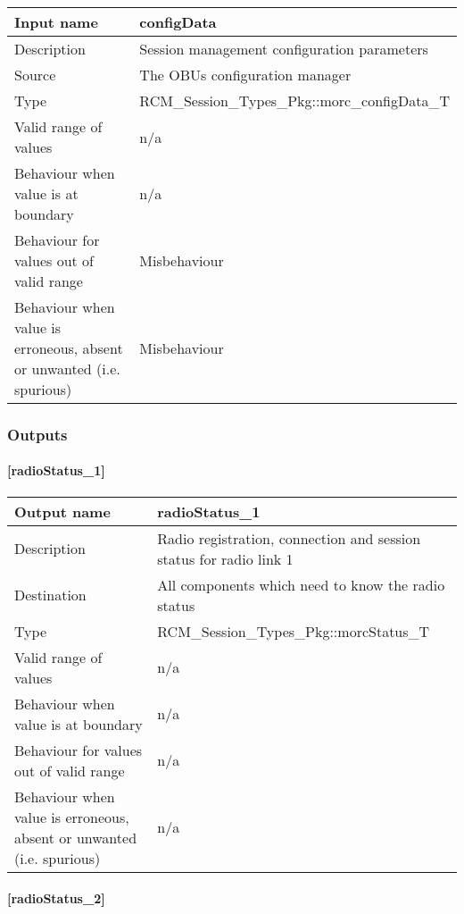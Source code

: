 \begin{longtable}{p{}p{}}
	\toprule
	Input name				& configData \\
	\midrule
	Description				& Session management configuration parameters \\
	\midrule
	Source					& The OBUs configuration manager \\ 
	\midrule
	Type					& RCM\_Session\_Types\_Pkg::morc\_configData\_T \\
	\midrule
	Valid range of values	& n/a \\
	\midrule
	Behaviour when value is at boundary	& n/a \\
	\midrule
	Behaviour for values out of valid range	& Misbehaviour \\
	\midrule
	Behaviour when value is erroneous, absent or unwanted (i.e. spurious) & Misbehaviour \\
	\bottomrule
\end{longtable}


\subsubsection{Outputs}\label{s:manage_radio_communication_outputs}

\paragraph{[radioStatus\_1]}

\begin{longtable}{p{}p{}}
\toprule
Output name				& radioStatus\_1 \\
\midrule
Description				& Radio registration, connection and session status for radio link 1 \\
\midrule
Destination				& All components which need to know the radio status \\ 
\midrule
Type					& RCM\_Session\_Types\_Pkg::morcStatus\_T \\
\midrule
Valid range of values	& n/a \\
\midrule
Behaviour when value is at boundary	& n/a \\
\midrule
Behaviour for values out of valid range	& n/a \\
\midrule
Behaviour when value is erroneous, absent or unwanted (i.e. spurious) & n/a \\
\bottomrule
\end{longtable}

\paragraph{[radioStatus\_2]}

